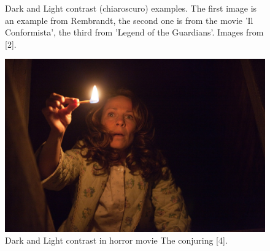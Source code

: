 \documentclass[12pt,a4paper]{article}
\begin{document}
\begin{figure}
\begin{minipage}{\textwidth}
\end{minipage}
\caption{Dark and Light contrast (chiaroscuro) examples. The first image is an example from Rembrandt, the second one is from the movie 'Il Conformista', the third from 'Legend of the Guardians'. Images from [2].}
\label{img_chiaro}
\end{figure}

\begin{figure}
\center
\includegraphics[scale=1]{images/conjuring.jpg} 
\caption{Dark and Light contrast in horror movie The conjuring [4].}
\label{img_conjuring}
\end{figure}
\end{document}
